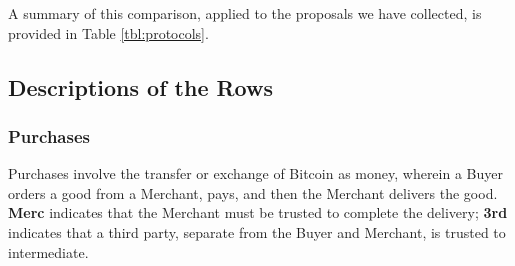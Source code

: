 A summary of this comparison, applied to the proposals we have collected, is provided in Table \ref{tbl:protocols}.

\subsection{Descriptions of the Rows}

\subsubsection{Purchases}
Purchases involve the transfer or exchange of Bitcoin as money, wherein a Buyer orders a good from a Merchant, pays, and then the Merchant delivers the good. {\bf Merc} indicates that the Merchant must be trusted to complete the delivery; {\bf 3rd} indicates that a third party, separate from the Buyer and Merchant, is trusted to intermediate.
